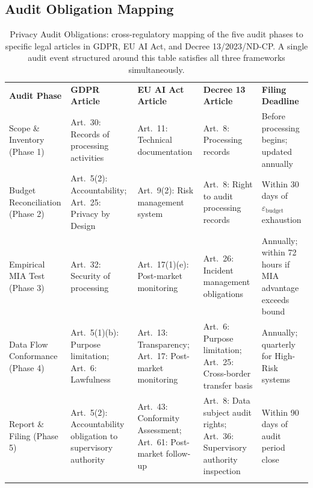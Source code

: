 \subsection{Audit Obligation Mapping}
\label{subsec:audit_obligation_mapping}

\begin{table}[ht]
\centering
\caption{Privacy Audit Obligations: cross-regulatory mapping of the five audit phases to specific legal articles in GDPR, EU AI Act, and Decree 13/2023/ND-CP. A single audit event structured around this table satisfies all three frameworks simultaneously.}
\label{tab:audit_obligations}
\renewcommand{\arraystretch}{1.35}
\begin{tabular}{p{2.8cm} p{2.5cm} p{2.5cm} p{2.4cm} p{2.5cm}}
\hline\noalign{\smallskip}
\textbf{Audit Phase} & \textbf{GDPR Article} & \textbf{EU AI Act Article} & \textbf{Decree 13 Article} & \textbf{Filing Deadline} \\
\noalign{\smallskip}\svhline\noalign{\smallskip}
Scope \& Inventory (Phase 1) & Art.~30: Records of processing activities & Art.~11: Technical documentation & Art.~8: Processing records & Before processing begins; updated annually \\[4pt]
Budget Reconciliation (Phase 2) & Art.~5(2): Accountability; Art.~25: Privacy by Design & Art.~9(2): Risk management system & Art.~8: Right to audit processing records & Within 30 days of $\varepsilon_{\text{budget}}$ exhaustion \\[4pt]
Empirical MIA Test (Phase 3) & Art.~32: Security of processing & Art.~17(1)(e): Post-market monitoring & Art.~26: Incident management obligations & Annually; within 72 hours if MIA advantage exceeds bound \\[4pt]
Data Flow Conformance (Phase 4) & Art.~5(1)(b): Purpose limitation; Art.~6: Lawfulness & Art.~13: Transparency; Art.~17: Post-market monitoring & Art.~6: Purpose limitation; Art.~25: Cross-border transfer basis & Annually; quarterly for High-Risk systems \\[4pt]
Report \& Filing (Phase 5) & Art.~5(2): Accountability obligation to supervisory authority & Art.~43: Conformity Assessment; Art.~61: Post-market follow-up & Art.~8: Data subject audit rights; Art.~36: Supervisory authority inspection & Within 90 days of audit period close \\
\noalign{\smallskip}\hline\noalign{\smallskip}
\end{tabular}
\end{table}

